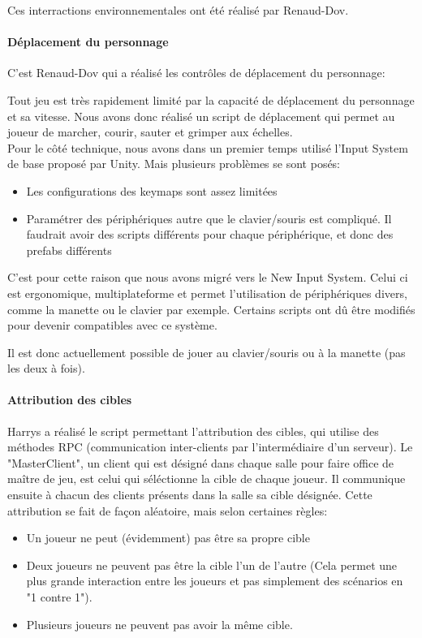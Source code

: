             Ces interractions environnementales ont été réalisé par Renaud-Dov.

        \paragraph{Déplacement du personnage}
            C'est Renaud-Dov qui a réalisé les contrôles de déplacement du personnage:
        
            Tout jeu est très rapidement limité par la capacité de déplacement du personnage et sa vitesse.
            Nous avons donc réalisé un script de déplacement qui permet au joueur de marcher, courir, sauter et grimper aux échelles.\\

            Pour le côté technique, nous avons dans un premier temps utilisé l'Input System de base proposé par Unity. Mais plusieurs problèmes se sont posés:
            \begin{itemize}
                \item Les configurations des keymaps sont assez limitées
                \item Paramétrer des périphériques autre que le clavier/souris est compliqué. Il faudrait avoir des scripts différents pour chaque périphérique, et donc des prefabs différents
            \end{itemize}
            C'est pour cette raison que nous avons migré vers le New Input System.
            Celui ci est ergonomique, multiplateforme et permet l'utilisation de périphériques divers, comme la manette ou le clavier par exemple.
            Certains scripts ont dû être modifiés pour devenir compatibles avec ce système.

            Il est donc actuellement possible de jouer au clavier/souris ou à la manette (pas les deux à fois).
            
        \paragraph{Attribution des cibles}
            
            Harrys a réalisé le script permettant l'attribution des cibles, qui utilise des méthodes RPC (communication inter-clients par l'intermédiaire d'un serveur). Le "MasterClient", un client qui est désigné dans chaque salle pour faire office de maître de jeu, est celui qui séléctionne la cible de chaque joueur. Il communique ensuite à chacun des clients présents dans la salle sa cible désignée. Cette attribution se fait de façon aléatoire, mais selon certaines règles:
            \begin{itemize}
                \item Un joueur ne peut (évidemment) pas être sa propre cible
                \item Deux joueurs ne peuvent pas être la cible l'un de l'autre (Cela permet une plus grande interaction entre les joueurs et pas simplement des scénarios en "1 contre 1").
                \item Plusieurs joueurs ne peuvent pas avoir la même cible.
            \end{itemize}
                
